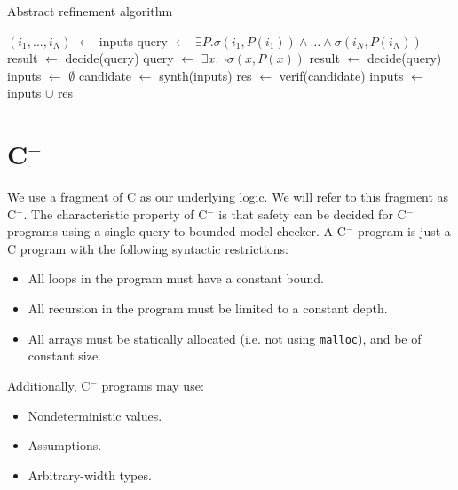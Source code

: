 \documentclass[a4paper]{llncs}
\newcommand{\newC}{C$^-$\xspace}
\newcommand*\Let[2]{\State #1 $\gets$ #2}
\begin{document}
\begin{algorithm}
 \caption{Abstract refinement algorithm
 \label{fig:abstract-refinement-code}}
 

 \begin{algorithmic}[1]
\Statex
{}
  \Let{$(i_1, \ldots, i_N)$}{inputs}
  \Let{query}{$\exists P . \sigma(i_1, P(i_1)) \land \ldots \land \sigma(i_N, P(i_N))$}
  \Let{result}{decide(query)}
    \State {}
  \Else
    \State {}
  \EndIf
\EndFunction
\Statex
{}
  \Let{query}{$\exists x . \lnot \sigma(x, P(x))$}
  \Let{result}{decide(query)}
    \State {}
  \Else
    \State {}
  \EndIf
\EndFunction
\Statex
{}
  \Let{inputs}{$\emptyset$}
  \Loop
    \Let{candidate}{synth(inputs)}
      \State {}
    \EndIf
    \Let{res}{verif(candidate)}
      \State {}
    \Else
      \Let{inputs}{inputs $\cup$ res}
    \EndIf
  \EndLoop
\EndFunction
 \end{algorithmic}
\end{algorithm}
 


\section{\newC}
\label{sec:logic}

We use a fragment of C as our underlying logic.  We will refer to this fragment
as \newC.  The characteristic property of \newC is that safety can be decided for
\newC programs using a single query to bounded model checker.  A \newC program is
just a C program with the following syntactic restrictions:

\begin{itemize}
 \item All loops in the program must have a constant bound.
 \item All recursion in the program must be limited to a constant depth.
 \item All arrays must be statically allocated (i.e. not using \texttt{malloc}),
 and be of constant size.
\end{itemize}

Additionally, \newC programs may use:

\begin{itemize}
 \item Nondeterministic values.
 \item Assumptions.
 \item Arbitrary-width types.
\end{itemize}
\end{document}
